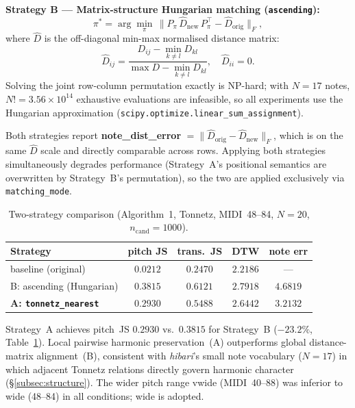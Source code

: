 \documentclass[conference,10pt,a4paper]{IEEEtran}
\begin{document}
\textbf{Strategy B --- Matrix-structure Hungarian matching
(\texttt{ascending}):}
\begin{equation}
\pi^{*} = \arg\min_{\pi}\,
  \bigl\|P_{\pi}\,\hat{D}_{\mathrm{new}}\,P_{\pi}^{\top}
         - \hat{D}_{\mathrm{orig}}\bigr\|_{F},
\end{equation}
where $\hat{D}$ is the off-diagonal min-max normalised distance matrix:
\begin{equation}
\hat{D}_{ij}
  = \frac{D_{ij}-\min_{k\neq l}D_{kl}}
         {\max D - \min_{k\neq l}D_{kl}},
\quad \hat{D}_{ii}=0.
\end{equation}
Solving the joint row-column permutation exactly is NP-hard; with
$N=17$ notes, $N!\!=3.56\times10^{14}$ exhaustive evaluations are
infeasible, so all experiments use the Hungarian approximation
(\texttt{scipy.optimize.linear\_sum\_assignment}).

Both strategies report \textbf{note\_dist\_error}
$=\|\hat{D}_{\mathrm{orig}}-\hat{D}_{\mathrm{new}}\|_F$,
which is on the same $\hat{D}$ scale and directly comparable across rows.
Applying both strategies simultaneously degrades performance (Strategy~A's
positional semantics are overwritten by Strategy~B's permutation), so the
two are applied exclusively via \texttt{matching\_mode}.

\begin{table}[t]
\centering
\caption{Two-strategy comparison (Algorithm~1, Tonnetz, MIDI~48--84,
         $N=20$, $n_{\mathrm{cand}}=1000$).}
\label{tab:redistrib}
\begin{tabular}{lcccc}
\toprule
Strategy & pitch JS & trans.\ JS & DTW & note err \\
\midrule
baseline (original)
  & $0.0212$ & $0.2470$ & $2.2186$ & --- \\
B: ascending (Hungarian)
  & $0.3815$ & $0.6121$ & $2.7918$ & $4.6819$ \\
\textbf{A: \texttt{tonnetz\_nearest}}
  & $\mathbf{0.2930}$ & $\mathbf{0.5488}$ & $2.6442$ & $\mathbf{3.2132}$ \\
\bottomrule
\end{tabular}
\end{table}

Strategy~A achieves pitch~JS $0.2930$ vs.\ $0.3815$ for Strategy~B
($-23.2\%$, Table~\ref{tab:redistrib}).  Local pairwise harmonic
preservation~(A) outperforms global distance-matrix alignment~(B),
consistent with \emph{hibari}'s small note vocabulary ($N=17$) in which
adjacent Tonnetz relations directly govern harmonic character
(\S\ref{subsec:structure}).  The wider pitch range vwide (MIDI~40--88)
was inferior to wide (48--84) in all conditions; wide is adopted.
\end{document}
